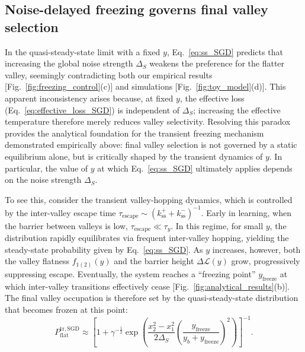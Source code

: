 \documentclass[aps,prx,reprint,superscriptaddress,longbibliography,nofootinbib,floatfix]{revtex4-2}
\begin{document}
\subsection{Noise-delayed freezing governs final valley selection}
In the quasi-steady-state limit with a fixed $y$, Eq.~\ref{eq:ss_SGD} predicts that increasing the global noise strength $\Delta_S$ weakens the preference for the flatter valley, seemingly contradicting both our empirical results [Fig.~\ref{fig:freezing_control}(c)] and simulations [Fig.~\ref{fig:toy_model}(d)]. This apparent inconsistency arises because, at fixed $y$, the effective loss (Eq.~\ref{eq:effective_loss_SGD}) is independent of $\Delta_S$; increasing the effective temperature therefore merely reduces valley selectivity. Resolving this paradox provides the analytical foundation for the transient freezing mechanism demonstrated empirically above: final valley selection is not governed by a static equilibrium alone, but is critically shaped by the transient dynamics of $y$. In particular, the value of $y$ at which Eq.~\ref{eq:ss_SGD} ultimately applies depends on the noise strength $\Delta_S$.

To see this, consider the transient valley-hopping dynamics, which is controlled by the inter-valley escape time $
\tau_{\mathrm{escape}} \sim (k_{\mathrm{ss}}^{+}+k_{\mathrm{ss}}^{-})^{-1}.
$
Early in learning, when the barrier between valleys is low, \(\tau_{\mathrm{escape}} \ll \tau_y\). In this regime, for small \(y\), the distribution rapidly equilibrates via frequent inter-valley hopping, yielding the steady-state probability given by Eq.~\ref{eq:ss_SGD}. As \(y\) increases, however, both the valley flatness \(f_{1(2)}(y)\) and the barrier height \(\Delta\mathcal{L}(y)\) grow, progressively suppressing escape. Eventually, the system reaches a ``freezing point'' \(y_{\mathrm{freeze}}\) at which inter-valley transitions effectively cease [Fig.~\ref{fig:analytical_results}(b)]. The final valley occupation is therefore set by the quasi-steady-state distribution that becomes frozen at this point:
\begin{equation}
P_{\mathrm{flat}}^{\mathrm{tr,SGD}} \approx 
\left[1+\gamma^{-\frac{1}{2}} 
\exp\!\left(\frac{x_2^2-x_1^2}{2 \Delta_S}
\left(\frac{y_\mathrm{freeze}}{y_b+y_\mathrm{freeze}}\right)^2\right)\right]^{-1}.
\label{eq:tr_SGD_original}
\end{equation}
\end{document}
